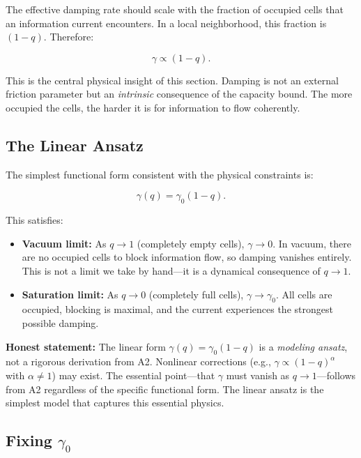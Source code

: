 \documentclass[aps,prd,twocolumn,showpacs,superscriptaddress,preprintnumbers]{revtex4-2}
\begin{document}
The effective damping rate should scale with the fraction of occupied cells that an information current encounters.
In a local neighborhood, this fraction is $(1-q)$.
Therefore:

\begin{equation}
\gamma \propto (1-q).
\label{eq:gamma_scaling}
\end{equation}

This is the central physical insight of this section.
Damping is not an external friction parameter but an \emph{intrinsic} consequence of the capacity bound.
The more occupied the cells, the harder it is for information to flow coherently.

\subsection{The Linear Ansatz}

The simplest functional form consistent with the physical constraints is:

\begin{equation}
\boxed{\gamma(q) = \gamma_0 (1-q)}.
\label{eq:gamma_linear}
\end{equation}

This satisfies:

\begin{itemize}
    \item \textbf{Vacuum limit:} As $q\to 1$ (completely empty cells), $\gamma\to 0$. In vacuum, there are no occupied cells to block information flow, so damping vanishes entirely. This is not a limit we take by hand---it is a dynamical consequence of $q\to 1$.
    \item \textbf{Saturation limit:} As $q\to 0$ (completely full cells), $\gamma\to\gamma_0$. All cells are occupied, blocking is maximal, and the current experiences the strongest possible damping.
\end{itemize}

\textbf{Honest statement:} The linear form $\gamma(q)=\gamma_0(1-q)$ is a \emph{modeling ansatz}, not a rigorous derivation from A2.
Nonlinear corrections (e.g., $\gamma\propto(1-q)^\alpha$ with $\alpha\neq 1$) may exist.
The essential point---that $\gamma$ must vanish as $q\to 1$---follows from A2 regardless of the specific functional form.
The linear ansatz is the simplest model that captures this essential physics.

\subsection{Fixing $\gamma_0$}
\end{document}
